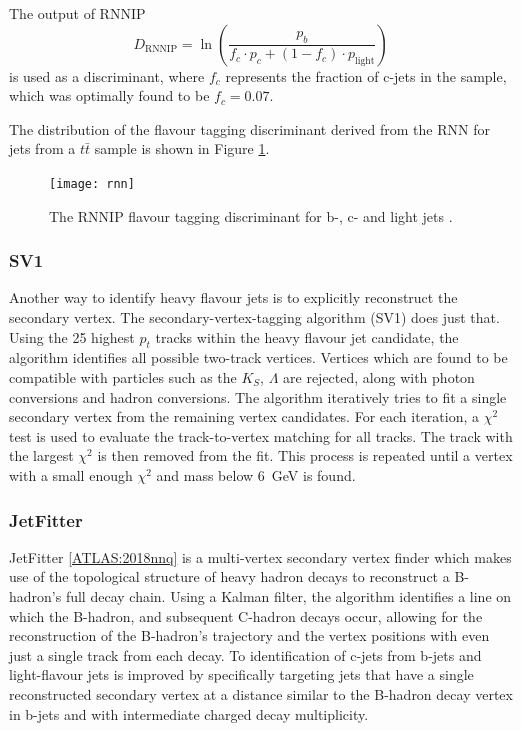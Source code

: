 \documentclass[10pt,a4paper]{book}
\begin{document}
The output of RNNIP 
\begin{equation}
    D_{\text{RNNIP}} = \ln\left(\frac{p_b}{f_c\cdot p_c + (1-f_c)\cdot p_\text{light}} \right)
    \label{discriminant}
\end{equation}
 is used as a discriminant, where $f_c$ represents the fraction of c-jets in the sample, which was optimally found to be $f_c = 0.07$.

 The distribution of the flavour tagging discriminant derived from the RNN for jets from a $t\bar{t}$ sample is shown in Figure \ref{fig:rnn}.

 \begin{figure}
     \centering
     \texttt{[image: rnn]}
     \caption{The RNNIP flavour tagging discriminant for b-, c- and light jets \cite{ATLAS:2022qxm}.}
     \label{fig:rnn}
 \end{figure}

 \subsubsection{SV1}
 \label{SV1}
Another way to identify heavy flavour jets is to explicitly reconstruct the secondary vertex. The secondary-vertex-tagging algorithm (SV1) \cite{ATLAS:2017kle} does just that. Using the 25 highest $p_t$ tracks within the heavy flavour jet candidate, the algorithm identifies all possible two-track vertices. Vertices which are found to be compatible with particles such as the $K_S$, $\Lambda$ are rejected, along with photon conversions and hadron conversions. The algorithm iteratively tries to fit a single secondary vertex from the remaining vertex candidates. For each iteration, a $\chi^2$ test is used to evaluate the track-to-vertex matching for all tracks. The track with the largest $\chi^2$ is then removed from the fit. This process is repeated until a vertex with a small enough $\chi^2$ and mass below 6~GeV is found.   
 
\subsubsection{JetFitter}

JetFitter \ref{ATLAS:2018nnq} is a multi-vertex secondary vertex finder which makes use of the topological structure of heavy hadron decays to reconstruct a B-hadron's full decay chain. Using a Kalman filter, the algorithm identifies a line on which the B-hadron, and subsequent C-hadron decays occur, allowing for the reconstruction of the B-hadron's trajectory and the vertex positions with even just a single track from each decay. To identification of c-jets from b-jets and light-flavour jets is improved by specifically targeting jets that have a single reconstructed secondary vertex at a distance similar to the B-hadron decay vertex in b-jets and with intermediate charged decay multiplicity. 
\end{document}
